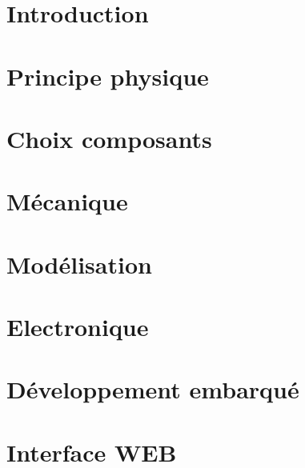 \documentclass[
    iai, %
    eem, %
]{heig-tb}
\begin{document}
\maketitle
\frontmatter


\preamble
\authentification


\tableofcontents
\listoffigures
\listoftables
\listoflistings



\printglossary[type=\acronymtype]


\mainmatter
\chapter{Introduction}

%
\chapter{Principe physique}

\label{chap:principe_physique}
\chapter{Choix composants}
\label{chap:choix_composants}



\chapter{Mécanique}
\label{chap:mecanique}

\chapter{Modélisation}
\label{chap:modelisation}

\chapter{Electronique}
\label{chap:electronique}

\chapter{Développement embarqué}
\label{chap:developpement_embarque}

\chapter{Interface WEB}
\label{chap:interface_web}

\end{document}
